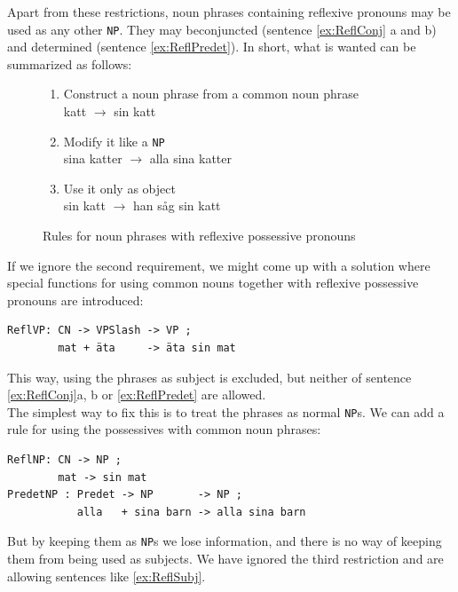 \documentclass{report}
\begin{document}
Apart from these restrictions, noun phrases containing reflexive pronouns
may be used as any other \verb-NP-. They may beconjuncted (sentence
\ref{ex:ReflConj} a and b) and determined (sentence \ref{ex:ReflPredet}).
In short, what is wanted can be summarized as follows:\\
\begin{figure}[h]
\begin{enumerate}
\item{
Construct a noun phrase from a common noun phrase \\
katt $\rightarrow$ sin katt} %
\item{Modify it like a \verb|NP|\\
sina katter $\rightarrow$ alla sina katter}
\item{Use it only as object\\
sin katt $\rightarrow$ han såg sin katt }
\end{enumerate}
\caption{Rules for noun phrases with reflexive possessive pronouns}
\label{fig:reflrestrict}
\end{figure}
If we ignore the second requirement, we might come up with a solution where
special functions for using common nouns
together with reflexive possessive pronouns are introduced:
\begin{verbatim}
ReflVP: CN -> VPSlash -> VP ;
        mat + äta     -> äta sin mat 
\end{verbatim}
This way, using the phrases as subject is excluded, but neither of sentence
\ref{ex:ReflConj}a, b or \ref{ex:ReflPredet} are allowed.\\
The simplest way to fix this is to treat the phrases as normal \verb_NP_s.
We can add a rule for using the possessives with common noun phrases:
\begin{verbatim}
ReflNP: CN -> NP ;
        mat -> sin mat 
PredetNP : Predet -> NP       -> NP ;
           alla   + sina barn -> alla sina barn
\end{verbatim}
But by keeping them as \verb_NP_s we lose information, and there is no way of
keeping them from being used as subjects. We have ignored the third restriction
and are allowing sentences like \ref{ex:ReflSubj}.
\end{document}
